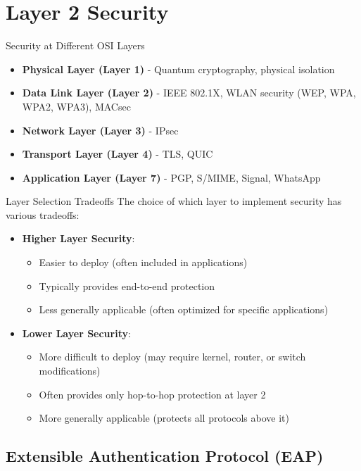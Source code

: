 \section{Layer 2 Security}


\begin{concept}{Security at Different OSI Layers}
\begin{itemize}
    \item \textbf{Physical Layer (Layer 1)} - Quantum cryptography, physical isolation
    \item \textbf{Data Link Layer (Layer 2)} - IEEE 802.1X, WLAN security (WEP, WPA, WPA2, WPA3), MACsec
    \item \textbf{Network Layer (Layer 3)} - IPsec
    \item \textbf{Transport Layer (Layer 4)} - TLS, QUIC
    \item \textbf{Application Layer (Layer 7)} - PGP, S/MIME, Signal, WhatsApp
\end{itemize}
\end{concept}

\begin{theorem}{Layer Selection Tradeoffs}
The choice of which layer to implement security has various tradeoffs:
\begin{itemize}
    \item \textbf{Higher Layer Security}:
    \begin{itemize}
        \item Easier to deploy (often included in applications)
        \item Typically provides end-to-end protection
        \item Less generally applicable (often optimized for specific applications)
    \end{itemize}
    \item \textbf{Lower Layer Security}:
    \begin{itemize}
        \item More difficult to deploy (may require kernel, router, or switch modifications)
        \item Often provides only hop-to-hop protection at layer 2
        \item More generally applicable (protects all protocols above it)
    \end{itemize}
\end{itemize}
\end{theorem}

\subsection{Extensible Authentication Protocol (EAP)}

